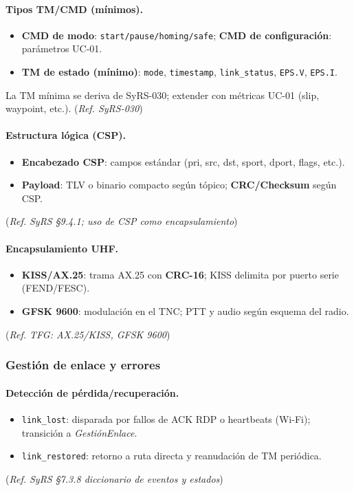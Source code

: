 \paragraph{Tipos TM/CMD (mínimos).}
\begin{itemize}
  \item \textbf{CMD de modo}: \verb|start/pause/homing/safe|; \textbf{CMD de configuración}: parámetros UC-01.
  \item \textbf{TM de estado (mínimo)}: \verb|mode|, \verb|timestamp|, \verb|link_status|, \verb|EPS.V|, \verb|EPS.I|.
\end{itemize}
La TM mínima se deriva de SyRS-030; extender con métricas UC-01 (slip, waypoint, etc.).%
(\emph{Ref. SyRS-030})%

\paragraph{Estructura lógica (CSP).}
\begin{itemize}
  \item \textbf{Encabezado CSP}: campos estándar (pri, src, dst, sport, dport, flags, etc.).
  \item \textbf{Payload}: TLV o binario compacto según tópico; \textbf{CRC/Checksum} según CSP.
\end{itemize}
(\emph{Ref. SyRS §9.4.1; uso de CSP como encapsulamiento})%

\paragraph{Encapsulamiento UHF.}
\begin{itemize}
  \item \textbf{KISS/AX.25}: trama AX.25 con \textbf{CRC-16}; KISS delimita por puerto serie (FEND/FESC).
  \item \textbf{GFSK 9600}: modulación en el TNC; PTT y audio según esquema del radio.
\end{itemize}
(\emph{Ref. TFG: AX.25/KISS, GFSK 9600})%

\subsubsection{Gestión de enlace y errores}
\paragraph{Detección de pérdida/recuperación.}
\begin{itemize}
  \item \texttt{link\_lost}: disparada por fallos de ACK RDP o heartbeats (Wi-Fi); transición a \emph{GestiónEnlace}.
  \item \texttt{link\_restored}: retorno a ruta directa y reanudación de TM periódica.
\end{itemize}
(\emph{Ref. SyRS §7.3.8 diccionario de eventos y estados})%

